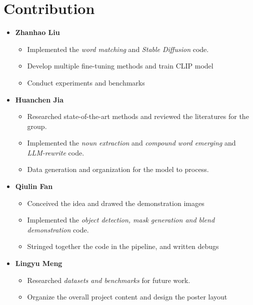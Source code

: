 \documentclass[11pt,letterpaper]{article}
\begin{document}
\section*{Contribution}
\begin{itemize}
    \item \textbf{Zhanhao Liu} 
    \begin{itemize}
        \item Implemented the \emph{word matching} and \emph{Stable Diffusion} code.
        \item Develop multiple fine-tuning methods and train CLIP model
        \item Conduct experiments and benchmarks 
    \end{itemize}
    \item \textbf{Huanchen Jia} 
    \begin{itemize}
        \item Researched state-of-the-art methods and reviewed the literatures for the group.
        \item Implemented the \emph{noun extraction} and \emph{compound word emerging} and \emph{LLM-rewrite} code.
        \item Data generation and organization for the model to process.
    \end{itemize}
    \item \textbf{Qiulin Fan} 
    \begin{itemize}
        \item Conceived the idea and drawed the demonstration images
        \item Implemented the \emph{object detection, mask generation and blend demonstration} code.
        \item         Stringed together the code in the pipeline, and written debugs
    \end{itemize}
    \item \textbf{Lingyu Meng} 
    \begin{itemize}
        \item Researched \emph{datasets and benchmarks} for future work.
        \item Organize the overall project content and design the poster layout

    \end{itemize}
\end{itemize}

\printbibliography


\appendix
\end{document}
